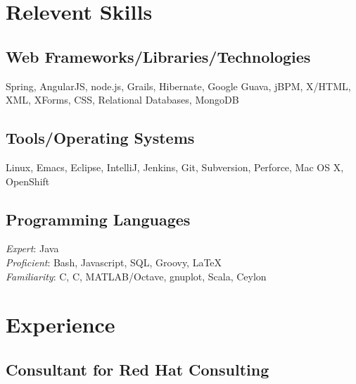 \documentclass[a4paper,11pt]{article}
\newcommand{\CC}{C\nolinebreak\hspace{-.05em}\raisebox{.4ex}{\tiny\bf
    +}\nolinebreak\hspace{-.10em}\raisebox{.4ex}{\tiny\bf +}}
\def\CC{{C\nolinebreak[4]\hspace{-.05em}\raisebox{.4ex}{\tiny\bf ++}}}
\begin{document}

  \section*{Relevent Skills}

  \begin{multicols}{2}
    \raggedright

    \subsection*{Web Frameworks/Libraries/Technologies}

    Spring, AngularJS, node.js, Grails, Hibernate, Google Guava, jBPM, X/HTML,
    XML, XForms, CSS, Relational Databases, MongoDB
    
    \subsection*{Tools/Operating Systems}

    Linux, Emacs, Eclipse, IntelliJ, Jenkins, Git, Subversion, Perforce, Mac OS
    X, OpenShift

    \subsection*{Programming Languages}

    \textsl{Expert}: Java \\
    \textsl{Proficient}: Bash, Javascript, SQL, Groovy, \LaTeX \\
    \textsl{Familiarity}: C, \CC, MATLAB/Octave, gnuplot, Scala, Ceylon
    
  \end{multicols}
  

\section*{Experience}

\subsection*{Consultant for Red Hat Consulting}
\end{document}
